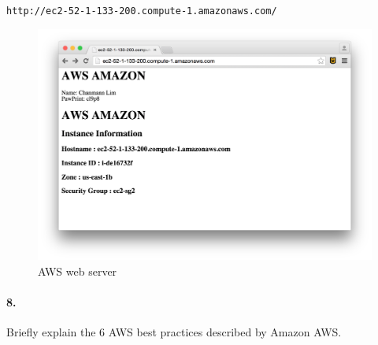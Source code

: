 \documentclass[a4paper]{article}
\begin{document}
\texttt{http://ec2-52-1-133-200.compute-1.amazonaws.com/} \\
\begin{figure}[H]
  \centering
    \includegraphics[scale=.4]{aws_web_server.png}
  \caption{AWS web server}
\end{figure} 

\paragraph{8. } Briefly explain the 6 AWS best practices described by Amazon AWS. 
\end{document}
